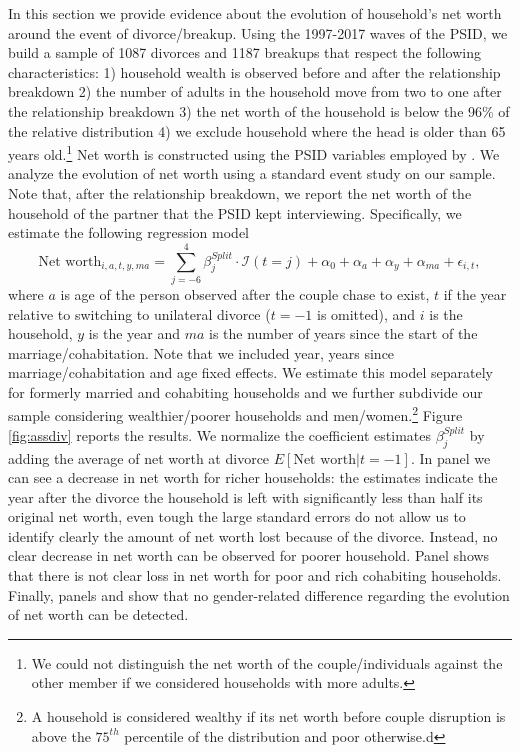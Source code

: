 \documentclass[12pt]{article}
\numberwithin{table}{section}
\begin{document}
In this section we provide evidence about the evolution of household's net worth around the event of divorce/breakup. Using the 1997-2017 waves of the PSID, we build a sample of 1087 divorces and 1187 breakups that respect the following characteristics: 1) household wealth is observed before and after the relationship  breakdown 2) the number of adults in the household move from two to one after the relationship breakdown 3) the net worth of the household is below the 96\% of the relative distribution 4) we exclude household where the head is older than 65 years old.\footnote{We could not distinguish the net worth of the couple/individuals against the other member if we considered households with more adults.} Net worth is constructed using the PSID variables employed by \cite{blundell2016}. We analyze the evolution of net worth using a standard event study on our sample. Note that, after the relationship breakdown, we report the net worth of the household of the partner that the PSID kept interviewing. Specifically, we estimate the following regression model
\begin{equation}\label{eq:ev_studa}
\text{Net worth}_{i,a,t,y,ma}=\sum_{j=-6}^{4}\beta^{Split}_j\cdot\mathcal{I}(t=j)+\alpha_{0}+\alpha_{a}+\alpha_{y}+\alpha_{ma}+\epsilon_{i,t},
\end{equation}
where $a$ is age of the person observed after the couple chase to exist, $t$ if the year relative to switching to unilateral divorce ($t=-1$ is omitted), and $i$ is the household, $y$ is the year and $ma$ is the number of years since the start of the marriage/cohabitation. Note that we included year, years since marriage/cohabitation and age fixed effects.  We estimate this model separately for formerly married and cohabiting households and we further subdivide our sample considering wealthier/poorer households and men/women.\footnote{A household is considered wealthy if its net worth before couple disruption is above the $75^{th}$ percentile of the distribution and poor otherwise.d} Figure \ref{fig:assdiv} reports the results. We normalize the coefficient estimates $\beta^{Split}_j$ by adding the average of net worth at divorce $E[\text{Net worth}|t = -1]$. In panel  we can see a decrease in net worth for richer households: the estimates indicate the year after the divorce the household is left with significantly less than half its original net worth, even tough the large standard errors do not allow us to identify clearly the amount of net worth lost because of the divorce. Instead, no clear decrease in net worth can be observed for poorer household. Panel  shows that there is not clear loss in net worth for poor and rich cohabiting households. Finally, panels  and  show that no gender-related difference regarding the evolution of net worth can be detected.
\end{document}
